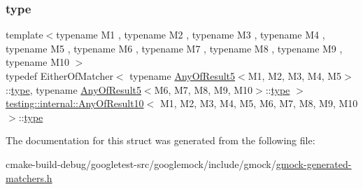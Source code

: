 \subsubsection{\texorpdfstring{type}{type}}
{\footnotesize\ttfamily template$<$typename M1 , typename M2 , typename M3 , typename M4 , typename M5 , typename M6 , typename M7 , typename M8 , typename M9 , typename M10 $>$ \\
typedef Either\+Of\+Matcher$<$ typename \mbox{\hyperlink{structtesting_1_1internal_1_1AnyOfResult5}{Any\+Of\+Result5}}$<$M1, M2, M3, M4, M5$>$\+::\mbox{\hyperlink{structtesting_1_1internal_1_1AnyOfResult10_aa1cb3d733f29716f2015db8a2b6c1c94}{type}}, typename \mbox{\hyperlink{structtesting_1_1internal_1_1AnyOfResult5}{Any\+Of\+Result5}}$<$M6, M7, M8, M9, M10$>$\+::\mbox{\hyperlink{structtesting_1_1internal_1_1AnyOfResult10_aa1cb3d733f29716f2015db8a2b6c1c94}{type}} $>$ \mbox{\hyperlink{structtesting_1_1internal_1_1AnyOfResult10}{testing\+::internal\+::\+Any\+Of\+Result10}}$<$ M1, M2, M3, M4, M5, M6, M7, M8, M9, M10 $>$\+::\mbox{\hyperlink{structtesting_1_1internal_1_1AnyOfResult10_aa1cb3d733f29716f2015db8a2b6c1c94}{type}}}



The documentation for this struct was generated from the following file\+:\begin{DoxyCompactItemize}
\item 
cmake-\/build-\/debug/googletest-\/src/googlemock/include/gmock/\mbox{\hyperlink{gmock-generated-matchers_8h}{gmock-\/generated-\/matchers.\+h}}\end{DoxyCompactItemize}
